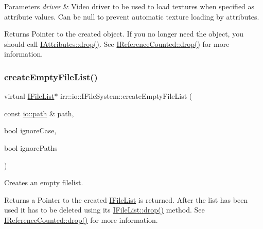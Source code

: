 \begin{DoxyParams}{Parameters}
{\em driver} & Video driver to be used to load textures when specified as attribute values. Can be null to prevent automatic texture loading by attributes. \\
\hline
\end{DoxyParams}
\begin{DoxyReturn}{Returns}
Pointer to the created object. If you no longer need the object, you should call \hyperlink{classirr_1_1IReferenceCounted_a03856a09355b89d178090c4a5f738543}{I\+Attributes\+::drop()}. See \hyperlink{classirr_1_1IReferenceCounted_a03856a09355b89d178090c4a5f738543}{I\+Reference\+Counted\+::drop()} for more information. 
\end{DoxyReturn}
\mbox{\label{classirr_1_1io_1_1IFileSystem_a4f8a69f557f2b7022f6cd7346c3e85d2}} 
\subsubsection{\texorpdfstring{create\+Empty\+File\+List()}{createEmptyFileList()}\hspace{0.1cm}{\footnotesize\ttfamily [1/2]}}
{\footnotesize\ttfamily virtual \hyperlink{classirr_1_1io_1_1IFileList}{I\+File\+List}$\ast$ irr\+::io\+::\+I\+File\+System\+::create\+Empty\+File\+List (\begin{DoxyParamCaption}\item[{const \hyperlink{namespaceirr_1_1io_a6468281622ce3a1c46b72e19f32dded5}{io\+::path} \&}]{path,  }\item[{bool}]{ignore\+Case,  }\item[{bool}]{ignore\+Paths }\end{DoxyParamCaption})\hspace{0.3cm}{\ttfamily [pure virtual]}}



Creates an empty filelist. 

\begin{DoxyReturn}{Returns}
a Pointer to the created \hyperlink{classirr_1_1io_1_1IFileList}{I\+File\+List} is returned. After the list has been used it has to be deleted using its \hyperlink{classirr_1_1IReferenceCounted_a03856a09355b89d178090c4a5f738543}{I\+File\+List\+::drop()} method. See \hyperlink{classirr_1_1IReferenceCounted_a03856a09355b89d178090c4a5f738543}{I\+Reference\+Counted\+::drop()} for more information. 
\end{DoxyReturn}
\mbox{\label{classirr_1_1io_1_1IFileSystem_a4f8a69f557f2b7022f6cd7346c3e85d2}} 
